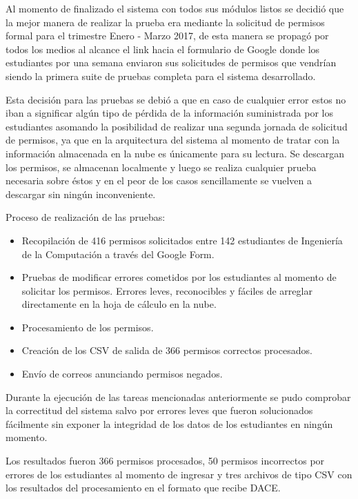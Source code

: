\documentclass[]{article}
\begin{document}
Al momento de finalizado el sistema con todos sus módulos listos se
decidió que la mejor manera de realizar la prueba era mediante la
solicitud de permisos formal para el trimestre Enero - Marzo 2017, de
esta manera se propagó por todos los medios al alcance el link hacia el
formulario de Google donde los estudiantes por una semana enviaron sus
solicitudes de permisos que vendrían siendo la primera suite de pruebas
completa para el sistema desarrollado.

Esta decisión para las pruebas se debió a que en caso de cualquier error
estos no iban a significar algún tipo de pérdida de la información
suministrada por los estudiantes asomando la posibilidad de realizar una
segunda jornada de solicitud de permisos, ya que en la arquitectura del
sistema al momento de tratar con la información almacenada en la nube es
únicamente para su lectura. Se descargan los permisos, se almacenan
localmente y luego se realiza cualquier prueba necesaria sobre éstos y
en el peor de los casos sencillamente se vuelven a descargar sin ningún
inconveniente.

Proceso de realización de las pruebas:

\begin{itemize}
\itemsep1pt\parskip0pt
\item
  Recopilación de 416 permisos solicitados entre 142 estudiantes de
  Ingeniería de la Computación a través del Google Form.
\item
  Pruebas de modificar errores cometidos por los estudiantes al momento
  de solicitar los permisos. Errores leves, reconocibles y fáciles de
  arreglar directamente en la hoja de cálculo en la nube.
\item
  Procesamiento de los permisos.
\item
  Creación de los CSV de salida de 366 permisos correctos procesados.
\item
  Envío de correos anunciando permisos negados.
\end{itemize}

Durante la ejecución de las tareas mencionadas anteriormente se pudo
comprobar la correctitud del sistema salvo por errores leves que fueron
solucionados fácilmente sin exponer la integridad de los datos de los
estudiantes en ningún momento.

Los resultados fueron 366 permisos procesados, 50 permisos incorrectos
por errores de los estudiantes al momento de ingresar y tres archivos de
tipo CSV con los resultados del procesamiento en el formato que recibe
DACE.
\end{document}
